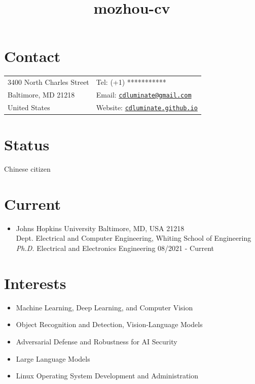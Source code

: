 \documentclass[10pt,margin,line,pifont,palatino,courier]{res}
\newcommand{\email}[1]{\href{mailto:#1}{\tt #1}}
\begin{document}
\title{mozhou-cv}
\begin{resume}

\section{\sc Contact}

\vspace{.05in}
\begin{tabular}{@{}p{2.2in}p{2.2in}}
3400 North Charles Street & Tel: (+1) *********** \\
Baltimore, MD 21218       & Email: \email{cdluminate@gmail.com}\\
United States	          & Website: \href{https://cdluminate.github.io/}{\tt cdluminate.github.io}
\end{tabular}

\section{\sc Status}
Chinese citizen

\section{\sc Current}

\begin{itemize}[leftmargin=*]
\item Johns Hopkins University \hfill Baltimore, MD, USA 21218\\
    Dept. Electrical and Computer Engineering, Whiting School of Engineering\\
	\textit{Ph.D.} Electrical and Electronics Engineering \hfill 08/2021 - Current\\
\end{itemize}

\section{\sc Interests}
\begin{itemize}[noitemsep, leftmargin=*]
	\item Machine Learning, Deep Learning, and Computer Vision
	\item Object Recognition and Detection, Vision-Language Models
	\item Adversarial Defense and Robustness for AI Security
    \item Large Language Models
	\item Linux Operating System Development and Administration
\end{itemize}
 

\end{resume}
\end{document}
